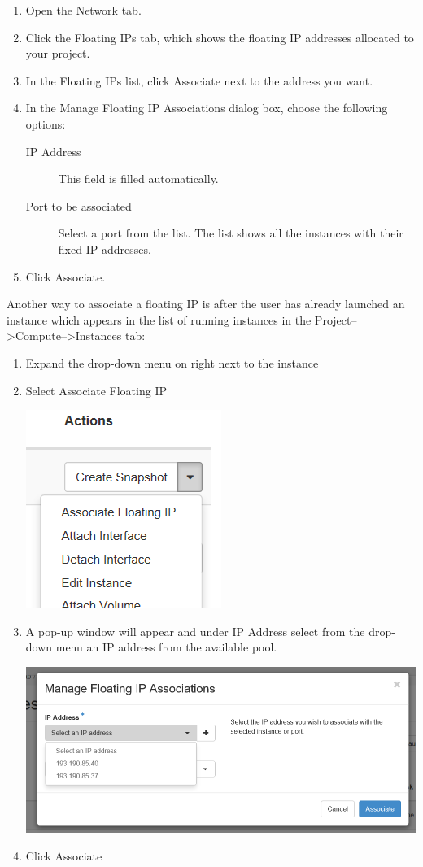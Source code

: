 \begin{enumerate}
\item Open the Network tab.
\item Click the Floating IPs tab, which shows the floating IP
  addresses allocated to your project.
\item In the Floating IPs list, click Associate next to the address you want.
\item In the Manage Floating IP Associations dialog box, choose the
  following options:

  \begin{description}
  \item[IP Address] This field is filled automatically.
  \item[Port to be associated] Select a port from the list.  The list shows all the instances with their fixed IP addresses.
  \end{description}
\item Click Associate.
\end{enumerate}

Another way to associate a floating IP is after the user has already launched an instance which appears in the list of running instances in the Project-->Compute-->Instances tab:

\begin{enumerate}
\item Expand the drop-down menu on right next to the instance
\item Select Associate Floating IP
\begin{center}
\includegraphics[scale=0.7]{img/associate_IP_1.png}
\end{center}
\item A pop-up window will appear and under IP Address select from the
  drop-down menu an IP address from the available pool.
\begin{center}
\includegraphics[scale=0.5]{img/associate_IP_2.png}
\end{center}
\item Click Associate
\end{enumerate}

